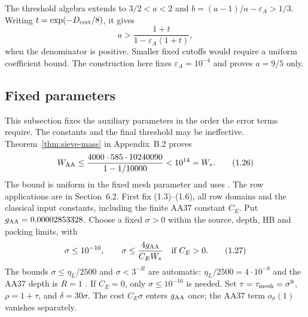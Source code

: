 The threshold algebra extends to $3/2<a<2$ and
$b=(a-1)/a-\varepsilon_A>1/3$.
Writing $t=\exp(-D_{\rm cert}/8)$, it gives
\[
 a>\frac{1+t}{1-\varepsilon_A(1+t)},                        \tag{1.25}
\]
when the denominator is positive.
Smaller fixed cutoffs would require a uniform coefficient bound.
The construction here fixes $\varepsilon_A=10^{-4}$ and proves $a=9/5$ only.

\subsection{Fixed parameters}\label{p2:sec:fixed-parameters}
This subsection fixes the auxiliary parameters in the order the error terms require.
The constants and the final threshold may be ineffective.
Theorem~\ref{thm:sieve-mass} in Appendix~B.2 proves
\[
 W_{\rm AA}\le
 \frac{4000\cdot585\cdot10240090}{1-1/10000}<10^{14}=W_* .    \tag{1.26}
\]
The bound is uniform in the fixed mesh parameter and uses \cite[\S~2.4, (2.28)--(2.30)]{Z1}.
The row applications are in Section~6.2.
First fix (1.3)--(1.6), all row domains and the classical input constants,
including the finite AA37 constant $C_E$.
Put $g_{\rm AA}=0.00002853328$.
Choose a fixed $\sigma>0$ within the source, depth, HB and packing limits, with
\[
 \sigma\le10^{-10},\qquad
 \sigma\le\frac{4g_{\rm AA}}{C_EW_*}\quad\text{if }C_E>0.  \tag{1.27}
\]
The bounds $\sigma\le\eta_L/2500$ and $\sigma<3^{-R}$ are automatic:
$\eta_L/2500=4\cdot10^{-8}$ and the AA37 depth is $R=1$
\cite[Theorem~2.6]{Z1}. If $C_E=0$, only $\sigma\le10^{-10}$ is needed.
Set $\tau=\tau_{\rm mesh}=\sigma^9$, $\rho=1+\tau$, and $\delta=30\sigma$.
The cost $C_E\sigma$ enters $g_{\rm AA}$ once;
the AA37 term $o_\sigma(1)$ vanishes separately.

